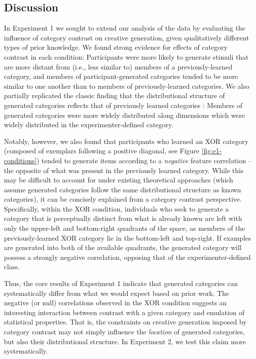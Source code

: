 \documentclass[12pt]{article}
\begin{document}
\begin{flushleft}
\subsection{Discussion} In Experiment 1 we sought to extend our analysis of the
\cite{jern2013probabilistic} data by evaluating the influence of category
contrast on creative generation, given qualitatively different types of prior
knowledge. We found strong evidence for effects of category contrast in each
condition: Participants were more likely to generate stimuli that are more
distant from (i.e., less similar to) members of a previously-learned category,
and members of participant-generated categories tended to be more similar to one
another than to members of previously-learned categories. We also partially
replicated the classic finding that the distributional structure of generated
categories reflects that of previously learned categories
\citep{jern2013probabilistic,ward1994structured}: Members of generated
categories were more widely distributed along dimensions which were widely
distributed in the experimenter-defined category.

Notably, however, we also found that participants who learned an XOR category
(composed of exemplars following a positive diagonal, see Figure
\ref{fig:e1-conditions}) tended to generate items according to a {\em negative}
feature correlation -- the opposite of what was present in the previously
learned category. While this may be difficult to account for under existing
theoretical approaches (which assume generated categories follow the same
distributional structure as known categories), it can be concisely explained
from a category contrast perspective. Specifically, within the XOR condition,
individuals who seek to generate a category that is perceptually distinct from
what is already known are left with only the upper-left and bottom-right
quadrants of the space, as members of the previously-learned XOR category lie in
the bottom-left and top-right. If examples are generated into both of the
available quadrants, the generated category will possess a strongly negative
correlation, opposing that of the experimenter-defined class.

Thus, the core results of Experiment 1 indicate that generated categories can
systematically differ from what we would expect based on prior work. The
negative (or null) correlations observed in the XOR condition suggests an
interesting interaction between contrast with a given category and emulation of
statistical properties. That is, the constraints on creative generation imposed
by category contrast may not simply influence the {\em location} of generated
categories, but also their distributional structure. In Experiment 2, we test
this claim more systematically.



\end{flushleft}
\end{document}
